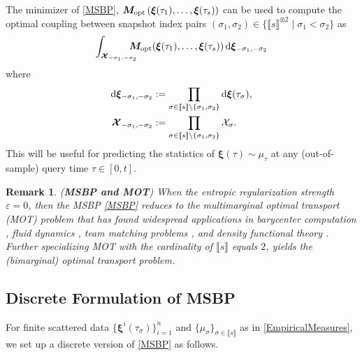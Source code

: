 \documentclass[letterpaper, 10pt, twocolumn]{ieeeconf}      %
\newtheorem{remark}{Remark}
\newcommand{\differential}{{\rm{d}}}
\begin{document}
The minimizer of \eqref{MSBP}, $\bm{M}_{\rm{opt}}\left(\bm{\xi}(\tau_{1}), \hdots,\bm{\xi}(\tau_{s})\right)$ can be used to compute the optimal coupling between snapshot index pairs $(\sigma_1,\sigma_2)\in\{\llbracket s\rrbracket^{\otimes 2}\mid\sigma_1 < \sigma_2\}$ as
\begin{align}
\int_{\bm{\mathcal{X}}_{-\sigma_{1},-\sigma_{2}}}\!\!\!\!\!\!\bm{M}_{\rm{opt}}\!\left(\bm{\xi}(\tau_{1}), \hdots,\bm{\xi}(\tau_{s})\right)\differential\bm{\xi}_{-\sigma_{1},-\sigma_{2}}
\label{bimarginalProj}
\end{align}
where
{\small{\begin{subequations}
\begin{align}
\differential\bm{\xi}_{-\sigma_{1},-\sigma_{2}}&:=\prod_{\sigma\in\llbracket s\rrbracket\setminus\{\sigma_1,\sigma_2\}}\differential\bm{\xi}(\tau_{\sigma}),\\
\bm{\mathcal{X}}_{-\sigma_{1},-\sigma_{2}}&:=\prod_{\sigma\in\llbracket s\rrbracket\setminus\{\sigma_1,\sigma_2\}} \mathcal{X}_{\sigma}.    
\end{align}
\label{DefxiXDouble}
\end{subequations}}}
This will be useful for predicting the statistics of $\bm{\xi}(\tau)\sim\mu_{\tau}$ at any (out-of-sample) query time $\tau\in[0,t]$. 

\begin{remark}\label{RemarkMOT}
(\textbf{MSBP and MOT}) When the entropic regularization strength $\varepsilon = 0$, then the MSBP \eqref{MSBP} reduces to the multimarginal optimal transport (MOT) problem \cite{ruschendorf2002n,pass2015multi} that has found widespread applications in barycenter computation \cite{agueh2011barycenters}, fluid dynamics \cite{brenier2008generalized,benamou2019generalized}, team matching problems \cite{carlier2015numerical}, and density functional theory \cite{buttazzo2012optimal,cotar2013density}. Further specializing MOT with the cardinality of $\llbracket s\rrbracket$ equals $2$, yields the (bimarginal) optimal transport \cite{peyre2019computational} problem. 
\end{remark}






\subsection{Discrete Formulation of MSBP}\label{subsecDiscreteFormulation}
\noindent
For finite scattered data $\{\bm{\xi}^{i}(\tau_{\sigma})\}_{i=1}^{n}$ and $\{\mu_{\sigma}\}_{\sigma\in\llbracket s\rrbracket}$ as in \eqref{EmpiricalMeasures}, we set up a discrete version of \eqref{MSBP} as follows. 
\end{document}
